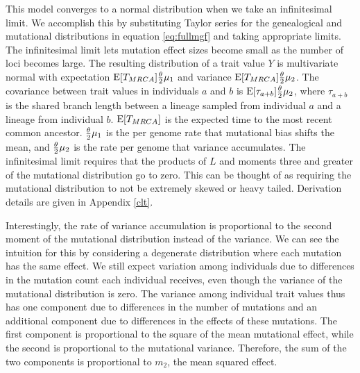 This model converges to a normal distribution when we take an infinitesimal
limit. We accomplish this by substituting Taylor series for the genealogical and
mutational distributions in equation \eqref{eq:fullmgf} and taking appropriate
limits. The infinitesimal limit lets mutation effect sizes become small as the
number of loci becomes large. The resulting distribution of a trait value $Y$ is
multivariate normal with expectation $\mathrm{E}[T_{MRCA}] \frac{\theta}{2} \mu_1$ and variance
$\mathrm{E}[T_{MRCA}] \frac{\theta}{2} \mu_2$. The covariance between trait values in individuals $a$
and $b$ is $\mathrm{E}[\tau_{a+b}] \frac{\theta}{2} \mu_2$, where $\tau_{a+b}$ is the shared branch
length between a lineage sampled from individual $a$ and a lineage from
individual $b$. $\mathrm{E}[T_{MRCA}]$ is the expected time to the most recent common
ancestor. $\frac{\theta}{2} \mu_1$ is the per genome rate that mutational bias shifts the
mean, and $\frac{\theta}{2} \mu_2$ is the rate per genome that variance accumulates. The
infinitesimal limit requires that the products of $L$ and moments three and
greater of the mutational distribution go to zero. This can be thought of as
requiring the mutational distribution to not be extremely skewed or heavy
tailed. Derivation details are given in Appendix \ref{clt}.

Interestingly, the rate of variance accumulation is proportional to the second
moment of the mutational distribution instead of the variance. We can see the
intuition for this by considering a degenerate distribution where each mutation
has the same effect. We still expect variation among individuals due to
differences in the mutation count each individual receives, even though the
variance of the mutational distribution is zero. The variance among individual
trait values thus has one component due to differences in the number of
mutations and an additional component due to differences in the effects of these
mutations. The first component is proportional to the square of the mean
mutational effect, while the second is proportional to the mutational variance.
Therefore, the sum of the two components is proportional to $m_2$, the mean
squared effect.

